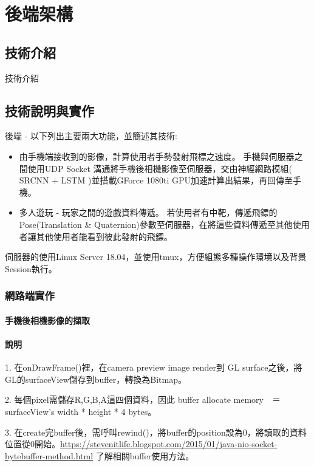 \chapter{後端架構}
\section{技術介紹}

    技術介紹

\section{技術說明與實作}
後端 - 以下列出主要兩大功能，並簡述其技術:
\begin{itemize}
\item 由手機端接收到的影像，計算使用者手勢發射飛標之速度。
手機與伺服器之間使用UDP Socket 溝通將手機後相機影像至伺服器，交由神經網路模組( SRCNN + LSTM )並搭載GForce 1080ti GPU加速計算出結果，再回傳至手機。
\item 多人遊玩 - 玩家之間的遊戲資料傳遞。
若使用者有中靶，傳遞飛鏢的Pose(Translation & Quaternion)參數至伺服器，在將這些資料傳遞至其他使用者讓其他使用者能看到彼此發射的飛鏢。
\end{itemize}

伺服器的使用Linux Server 18.04，並使用tmux，方便組態多種操作環境以及背景Session執行。


\subsection{網路端實作}
\subsubsection{手機後相機影像的擷取}
\subsubsection{說明}
1. 在onDrawFrame()裡，在camera preview image render到 GL surface之後，將GL的surfaceView儲存到buffer，轉換為Bitmap。

2. 每個pixel需儲存R,G,B,A這四個資料，因此 buffer allocate memory　＝　surfaceView’s width * height * 4 bytes。

3. 在create完buffer後，需呼叫rewind()，將buffer的position設為0，將讀取的資料位置從0開始。\href{可於此處}{https://stevenitlife.blogspot.com/2015/01/java-nio-socket-bytebuffer-method.html} 了解相關buffer使用方法。

